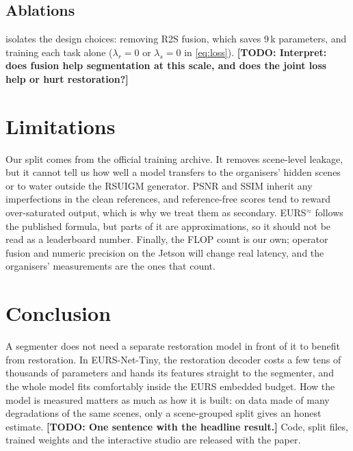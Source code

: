 \documentclass[10pt,twocolumn,letterpaper]{article}
\newcommand{\todo}[1]{{\color{red!75!black}\textbf{[TODO: #1]}}}
\newcommand{\todo}[1]{\errmessage{Unresolved TODO: #1}}
\newcommand{\tinynet}{EURS-Net-Tiny}
\begin{document}
\subsection{Ablations}
\begin{table}[t]
\centering\small
\resizebox{\linewidth}{!}{}
\caption{Ablations on the held-out test scenes.}
\label{tab:ablation}
\end{table}
 isolates the design choices: removing R2S fusion, which saves 9\,k parameters, and training
each task alone ($\lambda_r=0$ or $\lambda_s=0$ in \cref{eq:loss}). \todo{Interpret: does fusion help segmentation
at this scale, and does the joint loss help or hurt restoration?}

\section{Limitations}
Our split comes from the official training archive. It removes scene-level leakage, but it cannot tell us how
well a model transfers to the organisers' hidden scenes or to water outside the RSUIGM generator. PSNR and SSIM
inherit any imperfections in the clean references, and reference-free scores tend to reward over-saturated
output, which is why we treat them as secondary. EURS$^{\approx}$ follows the published formula, but parts of it
are approximations, so it should not be read as a leaderboard number. Finally, the FLOP count is our own;
operator fusion and numeric precision on the Jetson will change real latency, and the organisers' measurements
are the ones that count.

\section{Conclusion}
A segmenter does not need a separate restoration model in front of it to benefit from restoration. In
\tinynet{}, the restoration decoder costs a few tens of thousands of parameters and hands its features straight
to the segmenter, and the whole model fits comfortably inside the EURS embedded budget. How the model is
measured matters as much as how it is built: on data made of many degradations of the same scenes, only a
scene-grouped split gives an honest estimate. \todo{One sentence with the headline result.} Code, split files,
trained weights and the interactive studio are released with the paper.
\end{document}

